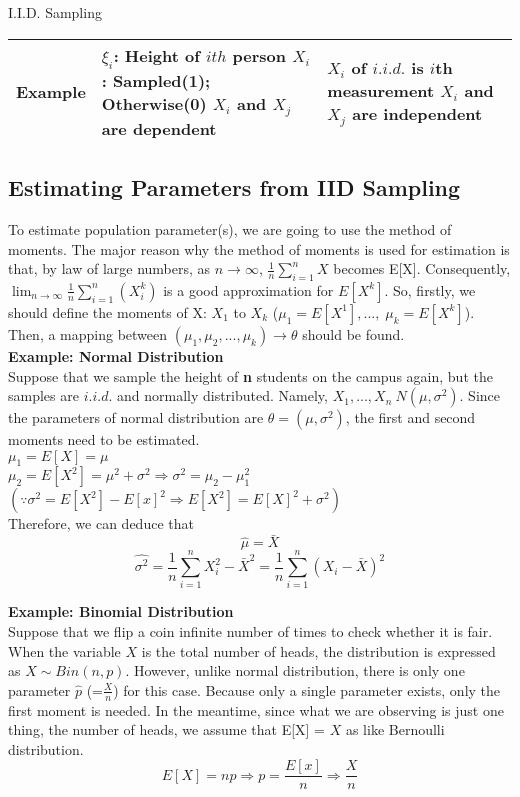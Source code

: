 \documentclass[12pt]{article}
\begin{document}
\begin{section}{I.I.D. Sampling}
\begin{longtable}{p{2.7cm}p{5.4cm}p{5.4cm}}
    \newline Example &$\xi_i$: Height of $ith$ person \newline $X_i$: Sampled(1); Otherwise(0) \newline  $X_i$ and $X_j$ are dependent & $X_i$ of $i.i.d.$ is $i$th measurement \newline $X_i$ and $X_j$ are independent \\ \hline
\end{longtable}

\section{Estimating Parameters from IID Sampling}
To estimate population parameter(s), we are going to use the method of moments. The major reason why  the method of moments is used for estimation is that, by law of large numbers, as $n \rightarrow \infty$, $\frac{1}{n} \sum\limits_{i=1}^{n} X$ becomes E[X]. Consequently, $\lim_{n \rightarrow \infty} \frac{1}{n} \sum\limits_{i=1}^{n}(X_i^k)$ is a good approximation for $E[X^k]$. So, firstly, we should define the moments of X: $X_1$ to $X_k$ ($\mu_1=E[X^1], ... ,\; \mu_k=E[X^k]$). Then, a mapping between $(\mu_1,\mu_2,...,\mu_k) \rightarrow \theta $ should be found. \\

\textbf{Example: Normal Distribution}\\
Suppose that we sample the height of \textbf{n} students on the campus again, but the samples are $i.i.d.$ and normally distributed. Namely, $X_1, ..., X_n ~ N(\mu, \sigma^2)$. Since the parameters of normal distribution are $\theta = (\mu, \sigma^2)$, the first and second moments  need to be estimated. \\

$\mu_1 = E[X] = \mu$\\
$\mu_2 = E[X^2] = \mu^2 + \sigma^2 \Rightarrow \sigma^2 = \mu_2 - \mu_1^2$    $(\because \sigma^2 = E[X^2] - E[x]^2 \Rightarrow E[X^2] = E[X]^2 + \sigma^2)$\\

Therefore, we can deduce that 
$$\hat{\mu} = \bar{X}$$ 
$$\hat{\sigma^2} = \frac{1}{n} \sum\limits_{i=1}^{n} X_i^2 - \bar{X}^2 = \frac{1}{n} \sum\limits_{i=1}^{n} (X_i - \bar{X})^2$$ \newline


\textbf{Example: Binomial Distribution}\\
Suppose that we flip a coin infinite number of times to check whether it is fair. When the variable $X$ is the total number of heads, the distribution is expressed as $X \sim Bin(n,p)$. However, unlike normal distribution, there is only one parameter $\hat{p}$ (=$\frac{X}{n}$) for this case. Because only a single parameter exists, only the first moment is needed. In the meantime, since what we are observing is just one thing, the number of heads, we assume that E[X] = $X$ as like Bernoulli distribution.
$$E[X] = np \Rightarrow p = \frac{E[x]}{n} \Rightarrow \frac{X}{n}$$\\



\end{section}
\end{document}

